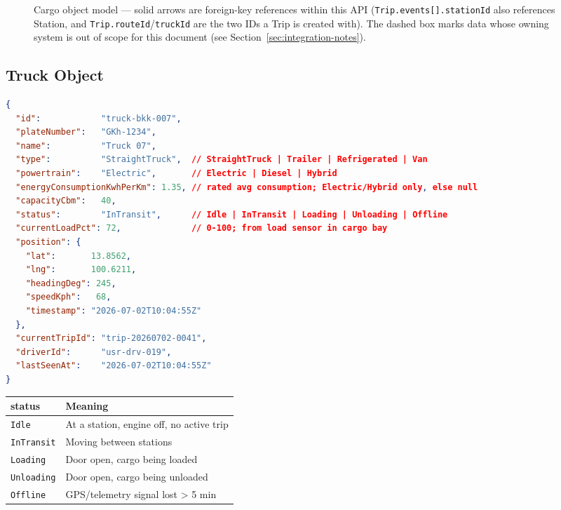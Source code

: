 \documentclass{article}
\begin{document}
\begin{figure}[h]
\caption{Cargo object model --- solid arrows are foreign-key references within
this API (\texttt{Trip.events[].stationId} also references Station, and
\texttt{Trip.routeId}/\texttt{truckId} are the two IDs a Trip is created
with). The dashed box marks data whose owning system is out of scope for this
document (see Section~\ref{sec:integration-notes}).}
\end{figure}

\newpage

\subsection{Truck Object}

\begin{lstlisting}[language=json, caption=Truck object schema]
{
  "id":            "truck-bkk-007",
  "plateNumber":   "GKh-1234",
  "name":          "Truck 07",
  "type":          "StraightTruck",  // StraightTruck | Trailer | Refrigerated | Van
  "powertrain":    "Electric",       // Electric | Diesel | Hybrid
  "energyConsumptionKwhPerKm": 1.35, // rated avg consumption; Electric/Hybrid only, else null
  "capacityCbm":   40,
  "status":        "InTransit",      // Idle | InTransit | Loading | Unloading | Offline
  "currentLoadPct": 72,              // 0-100; from load sensor in cargo bay
  "position": {
    "lat":       13.8562,
    "lng":       100.6211,
    "headingDeg": 245,
    "speedKph":   68,
    "timestamp": "2026-07-02T10:04:55Z"
  },
  "currentTripId": "trip-20260702-0041",
  "driverId":      "usr-drv-019",
  "lastSeenAt":    "2026-07-02T10:04:55Z"
}
\end{lstlisting}

\begin{center}
\begin{tabular}{ll}
\toprule
\textbf{status} & \textbf{Meaning}\\
\midrule
\texttt{Idle}       & At a station, engine off, no active trip\\
\texttt{InTransit}  & Moving between stations\\
\texttt{Loading}    & Door open, cargo being loaded\\
\texttt{Unloading}  & Door open, cargo being unloaded\\
\texttt{Offline}    & GPS/telemetry signal lost \textgreater{} 5 min\\
\bottomrule
\end{tabular}
\end{center}
\end{document}
